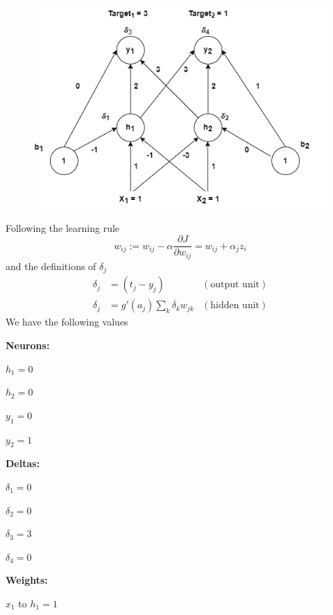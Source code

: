 \begin{enumerate}[label=(\alph*)]
	      \begin{figure}[ht]
		      \centering
		      \includegraphics[scale=0.6]{backprop.png}

		      \label{fig:backprop}
	      \end{figure}

	      \begin{tcolorbox}[title={Solution}]
		      Following the learning rule
		      $$ w_{ij} := w_{ij}- \alpha \frac{\partial J}{\partial w_{ij}} =
			      w_{ij} + \alpha_j z_i $$
		      and the definitions of $\delta_j$
		      $$
			      \begin{aligned}
				      \delta_j & = (t_j - y_j)                    & (\text{output unit}) \\
				      \delta_j & = g'(a_j) \sum_k \delta_k w_{jk} & (\text{hidden unit})
			      \end{aligned}
		      $$
		      We have the following values

		      \textbf{Neurons:}

		      $h_1 = 0$

		      $h_2 = 0$

		      $y_1 = 0$

		      $y_2 = 1$

		      \textbf{Deltas:}

		      $\delta_1 = 0$

		      $\delta_2 = 0$

		      $\delta_3 = 3$

		      $\delta_4 = 0$

		      \textbf{Weights:}

		      $x_1$ to $h_1 = 1$


\end{tcolorbox}
\end{enumerate}
